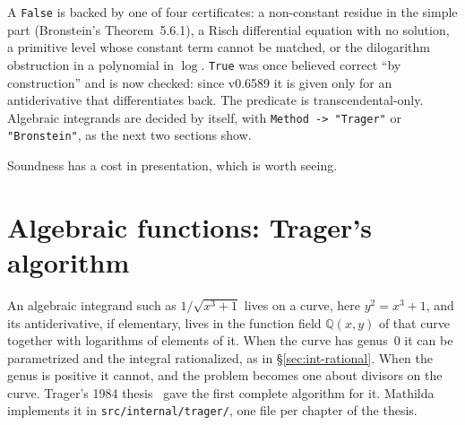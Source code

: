 A \texttt{False} is backed by one of four certificates: a non-constant residue in
the simple part (Bronstein's Theorem~5.6.1), a Risch differential equation with no
solution, a primitive level whose constant term cannot be matched, or the
dilogarithm obstruction in a polynomial in \(\log\). \texttt{True} was once
believed correct ``by construction'' and is now checked: since v0.6589 it is given
only for an antiderivative that differentiates back. The predicate is
transcendental-only. Algebraic integrands are decided by  itself, with
\texttt{Method -> "Trager"} or \texttt{"Bronstein"}, as the next two sections
show.

Soundness has a cost in presentation, which is worth seeing.

\begin{codepairs}
\end{codepairs}


\section{Algebraic functions: Trager's algorithm}
\label{sec:int-trager}

An algebraic integrand such as \(1/\sqrt{x^3+1}\) lives on a curve, here
\(y^2=x^3+1\), and its antiderivative, if elementary, lives in the function field
\(\mathbb{Q}(x,y)\) of that curve together with logarithms of elements of it. When
the curve has genus~\(0\) it can be parametrized and the integral rationalized, as
in \S\ref{sec:int-rational}. When the genus is positive it cannot, and the problem
becomes one about divisors on the curve. Trager's 1984 thesis~\cite{trager1984}
gave the first complete algorithm for it. Mathilda implements it in
\texttt{src/internal/trager/}, one file per chapter of the thesis.

